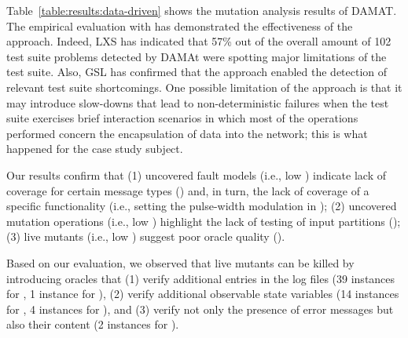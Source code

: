 Table~\ref{table:results:data-driven} shows the mutation analysis results of DAMAT.
The empirical evaluation with \ESAIL has demonstrated the effectiveness of the approach. Indeed, LXS has indicated that 57\% out of the overall amount of 102 test suite problems detected by DAMAt were spotting major limitations of the test suite. Also, GSL has confirmed that the approach enabled the detection of relevant test suite shortcomings.
One possible limitation of the approach is that it may introduce slow-downs that lead to non-deterministic failures when the test suite exercises brief interaction scenarios in which most of the operations performed concern the encapsulation of data into the network; this is what happened for the \GCSP case study subject.

Our results confirm that (1) uncovered fault models (i.e., low ) indicate lack of coverage for certain message types () and, in turn, the lack of coverage of a specific functionality (i.e., setting the pulse-width modulation in \ADCS); (2) uncovered mutation operations (i.e., low ) highlight the lack of testing of input partitions (); (3) live mutants (i.e., low ) suggest poor oracle quality ().

Based on our evaluation, we observed that live mutants can be killed by introducing oracles that (1) verify additional entries in the log files (39 instances for \ADCS, 1 instance for \GPS), (2) verify additional observable state variables (14 instances for \ADCS, 4 instances for \PARAM), and (3) verify not only the presence of error messages but also their content (2 instances for \ADCS).


